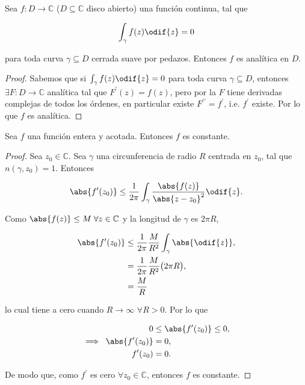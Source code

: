 \documentclass[../main.tex]{subfiles}
\begin{document}
\begin{theorem}\label{theorem:Morera}
    Sea \(f \colon D \to \mathbb{C}\) (\(D \subseteq \mathbb{C}\) disco abierto) una
    función continua, tal que

    \begin{equation*}
        \int_{\gamma}^{}f(z)\odif{z} = 0
    \end{equation*}

    para toda curva \(\gamma \subseteq D\) cerrada suave por pedazos. Entonces \(f\) es
    analítica en \(D\).
\end{theorem}

\begin{proof}
    Sabemos que si \(\int_{\gamma}^{}f(z)\odif{z} = 0\) para toda curva \(\gamma
    \subseteq D\), entonces \(\exists F\colon D \to \mathbb{C}\) analítica tal que
    \(F^{\prime}(z) = f(z)\), pero por la 
    \(F\) tiene derivadas complejas de todos los órdenes, en particular existe
    \(F^{\prime\prime} = f^{\prime}\), i.e. \(f^{\prime}\) existe. Por lo que \(f\) es
    analítica.
\end{proof}

\begin{theorem}
    Sea \(f\) una función entera y acotada. Entonces \(f\) es constante.
\end{theorem}

\begin{proof}
    Sea \(z_{0}\in  \mathbb{C}\). Sea \(\gamma\) una circunferencia de radio \(R\)
    centrada en \(z_{0}\), tal que \(n(\gamma, z_{0}) = 1\). Entonces

    \begin{equation*}
        \abs{f^{\prime}(z_{0})} \leq
        \dfrac{1}{2\pi}\int_{\gamma}^{}\dfrac{\abs{f(z)}}{\abs{z - z_{0}}^{2}}\odif{z}.
    \end{equation*}

    Como \(\abs{f(z)} \leq M\; \forall z\in \mathbb{C}\) y la longitud de \(\gamma\) es
    \(2\pi R\),

    \begin{align*}
        \abs{f^{\prime}(z_{0})} &\leq
        \dfrac{1}{2\pi}\dfrac{M}{R^{2}}\int_{\gamma}^{}\abs{\odif{z}},\\
        &= \dfrac{1}{2\pi}\dfrac{M}{R^{2}}\bigl(2\pi R\bigr),\\
        &= \dfrac{M}{R}
    \end{align*}

    lo cual tiene a cero cuando \(R \to \infty\) \(\forall R > 0\). Por lo que

    \begin{align*}
        0 &\leq \abs{f^{\prime}(z_{0})} \leq 0,\\
        \implies\; \abs{f^{\prime}(z_{0})} &= 0,\\
        f^{\prime}(z_{0}) &= 0.
    \end{align*}

    De modo que, como \(f^{\prime}\) es cero \(\forall z_{0}\in \mathbb{C}\),
    entonces \(f\)
    es constante.
\end{proof}
\end{document}
